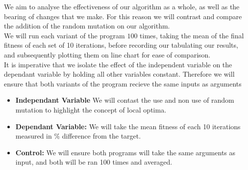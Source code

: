 \documentclass[a4paper]{article}
\begin{document}



We aim to analyse the effectiveness of our algorithm as a whole, as well as the bearing of
changes that we make. For this reason we will contrast and compare the addition of
the random mutation on our algorithm. \\

We will run each variant of the program $100$ times, taking the mean of the 
final fitness of each set of 10 iterations, before recording our tabulating our results, 
and subsequently plotting them on line chart for ease of comparison. \\

It is imperative that we isolate the effect of the independent variable on the dependant variable 
by holding all other variables constant. Therefore we will ensure that both variants of the program
recieve the same inputs as arguments\\



\vspace{12mm}

\begin{itemize}
  \item \textbf{Independant Variable} We will contast the use and non use of random mutation
    to highlight the concept of local optima.
\end{itemize}

\begin{itemize}
  \item \textbf{Dependant Variable:} We will take the mean fitness of each 10 iterations
    measured in \% difference from the target.
\end{itemize}

\begin{itemize}
  \item \textbf{Control:} We will ensure both programs will take the same arguments as input, 
    and both will be ran 100 times and averaged.
\end{itemize}
\end{document}
